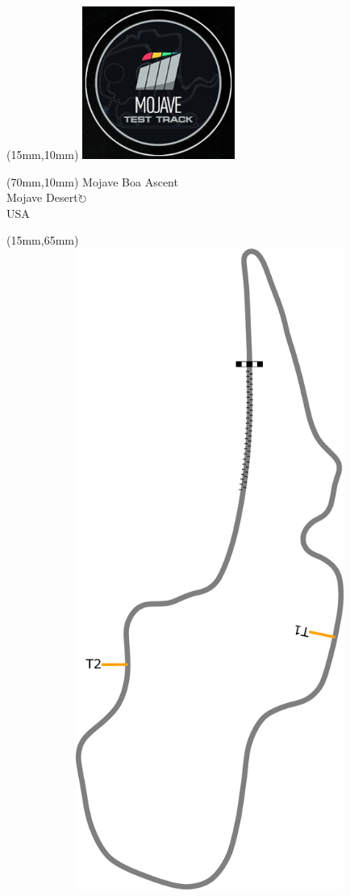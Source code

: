 \null\newpage
\begin{textblock*}{50mm}(15mm,10mm)%
\includegraphics[width=50mm]{LG/MOJA.png}
\end{textblock*}
\begin{textblock*}{130mm}(70mm,10mm)%
{\fontsize{20}{20}\selectfont Mojave Boa Ascent\\}
{\fontsize{16}{16}\selectfont Mojave Desert\hfill \Large$\circlearrowright$\\}
{\fontsize{12}{12}\selectfont USA\\}
\end{textblock*}
\begin{textblock*}{185mm}(15mm,65mm)%
\centering
\mbox{\includegraphics[width=185mm,height=210mm,keepaspectratio]{PT/MOJABA.pdf}}
\end{textblock*}
